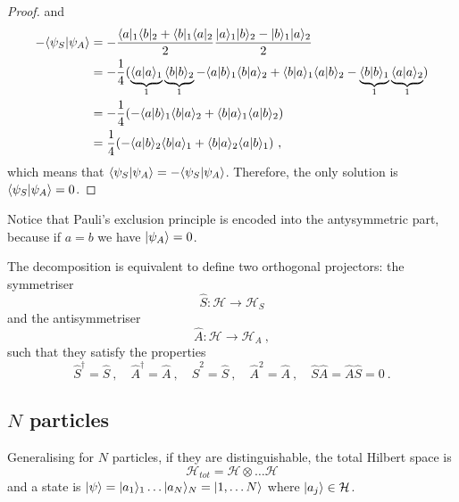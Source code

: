 \begin{proof}
    and 
    \begin{equation*}
    \begin{aligned}
        - \langle\psi_S\vert\psi_A\rangle & = - \frac{\langle a\vert_1\langle b\vert_2 + \langle b\vert_1\langle a\vert_2}{2} \frac{\vert a\rangle_1 \vert b\rangle_2 - \vert b\rangle_1 \vert a\rangle_2}{2} \\ & = - \frac{1}{4} (\underbrace{\langle a\vert a\rangle_1}_1 \underbrace{\langle b\vert b\rangle_2}_1 - \langle a\vert b\rangle_1 \langle b\vert a\rangle_2 + \langle b\vert a\rangle_1 \langle a\vert b\rangle_2 - \underbrace{\langle b\vert b\rangle_1}_1 \underbrace{\langle a\vert a\rangle_2}_1) \\ & = - \frac{1}{4} (- \langle a\vert b\rangle_1 \langle b\vert a\rangle_2 + \langle b\vert a\rangle_1 \langle a\vert b\rangle_2) \\ & = \frac{1}{4} (- \langle a\vert b\rangle_2 \langle b\vert a\rangle_1 + \langle b\vert a\rangle_2 \langle a\vert b\rangle_1 ) ~,
    \end{aligned}
    \end{equation*}
    which means that $\langle\psi_S\vert\psi_A\rangle = - \langle\psi_S\vert\psi_A\rangle$. Therefore, the only solution is $\langle\psi_S\vert\psi_A\rangle = 0$.
    \end{proof}
    
    Notice that Pauli's exclusion principle is encoded into the antysymmetric part, because if $a = b$ we have $\vert\psi_A\rangle = 0$.

    The decomposition is equivalent to define two orthogonal projectors: the symmetriser 
    \begin{equation*}
        \hat S \colon \mathcal H \rightarrow \mathcal H_S
    \end{equation*}
    and the antisymmetriser 
    \begin{equation*}
        \hat A \colon \mathcal H \rightarrow \mathcal H_A ~,
    \end{equation*}
    such that they satisfy the properties 
    \begin{equation}\label{proj}
        \hat S^\dagger = \hat S~, \quad \hat A^\dagger = \hat A~, \quad \hat S^2 = \hat S~, \quad \hat A^2 = \hat A~, \quad \hat S \hat A = \hat A \hat S = 0 ~.
    \end{equation}

\subsection{$N$ particles}

    Generalising for $N$ particles, if they are distinguishable, the total Hilbert space is 
    \begin{equation*}
        \mathcal H_{tot} = \mathcal H \otimes \ldots \mathcal H
    \end{equation*}
    and a state is $\vert\psi\rangle = \vert a_1\rangle_1 \ldots \vert a_N\rangle_N = \vert1, \ldots N\rangle$ where $\vert a_j\rangle \in \mathcal H$. 

